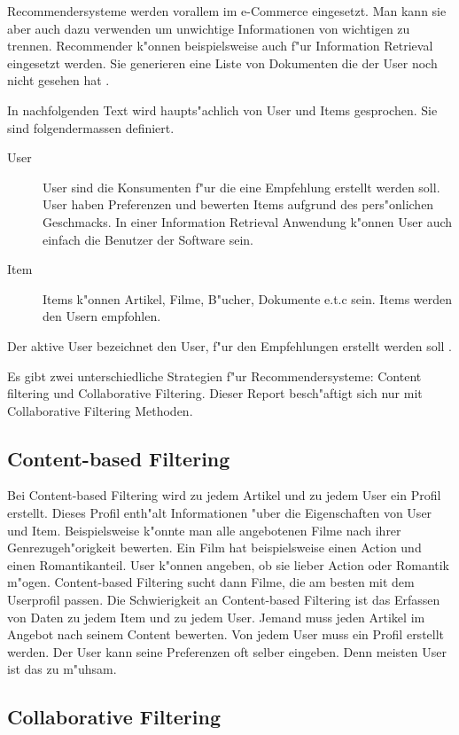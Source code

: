 \documentclass[a4paper, 12pt]{article}
\begin{document}
Recommendersysteme werden vorallem im e-Commerce eingesetzt. Man kann sie aber auch dazu verwenden um unwichtige Informationen von wichtigen zu trennen. Recommender k"onnen beispielsweise auch f"ur Information Retrieval eingesetzt werden. Sie generieren eine Liste von Dokumenten die der User noch nicht gesehen hat \cite{herlocker00}.

In nachfolgenden Text wird haupts"achlich von User und Items gesprochen. Sie sind folgendermassen definiert.

\begin{description}
\item[User] User sind die Konsumenten f"ur die eine Empfehlung erstellt werden soll. 
User haben Preferenzen und bewerten Items aufgrund des pers"onlichen Geschmacks. In einer Information Retrieval Anwendung k"onnen User auch einfach die Benutzer der Software sein.
\item[Item] 
Items k"onnen Artikel, Filme, B"ucher, Dokumente e.t.c sein. Items werden den Usern empfohlen.
\end{description}

Der aktive User bezeichnet den User, f"ur den Empfehlungen erstellt werden soll \cite{jannach11}.

Es gibt zwei unterschiedliche Strategien f"ur Recommendersysteme: Content filtering und Collaborative Filtering. Dieser Report besch"aftigt sich nur mit Collaborative Filtering Methoden. 

\subsection{Content-based Filtering}
\label{sec:contentbased}

Bei Content-based Filtering wird zu jedem Artikel und zu jedem User ein Profil erstellt. Dieses Profil enth"alt Informationen "uber die Eigenschaften von User und Item. Beispielsweise k"onnte man alle angebotenen Filme nach ihrer Genrezugeh"origkeit bewerten. Ein Film hat beispielsweise einen Action und einen Romantikanteil. User k"onnen angeben, ob sie lieber Action oder Romantik m"ogen. Content-based Filtering sucht dann Filme, die am besten mit dem Userprofil passen. Die Schwierigkeit an Content-based Filtering ist das Erfassen von Daten zu jedem Item und zu jedem User. Jemand muss jeden Artikel im Angebot nach seinem Content bewerten. Von jedem User muss ein Profil erstellt werden. Der User kann seine Preferenzen oft selber eingeben. Denn meisten User ist das zu m"uhsam.

\subsection{Collaborative Filtering}
\label{sec:collaborativefiltering}
\end{document}
